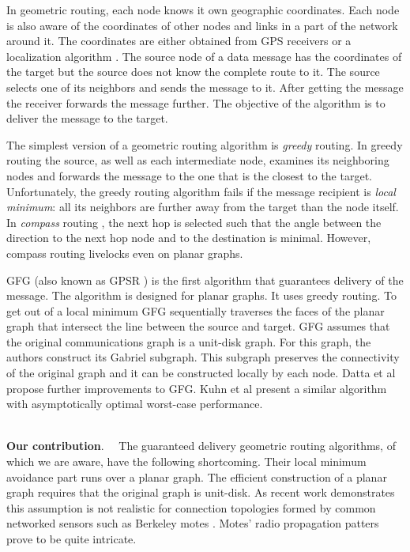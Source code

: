 \documentclass[conference]{IEEEtran}
\begin{document}
In geometric routing, each node knows it own geographic coordinates.
Each node is also aware of the coordinates of other nodes and links in
a part of the network around it. The coordinates are either obtained
from GPS receivers or a localization algorithm
\cite{Bulusu:2004:SCL}. The source node of a data message has the
coordinates of the target but the source does not know the complete
route to it. The source selects one of its neighbors and sends the
message to it.  After getting the message the receiver forwards the
message further.  The objective of the algorithm is to deliver the
message to the target.

The simplest version of a geometric routing algorithm is \emph{greedy}
routing. In greedy routing the source, as well as each intermediate
node, examines its neighboring nodes and forwards the message to the
one that is the closest to the target. Unfortunately, the greedy
routing algorithm fails if the message recipient is \emph{local
minimum}: all its neighbors are further away from the target than the
node itself. In \emph{compass} routing \cite{CCCG99*51}, the next hop
is selected such that the angle between the direction to the next hop
node and to the destination is minimal. However, compass routing
livelocks even on planar graphs.

GFG \cite{Bose01} (also known as GPSR \cite{MOBICOM00*243}) is the
first algorithm that guarantees delivery of the message. The algorithm
is designed for planar graphs. It uses greedy routing. To get out of a
local minimum GFG sequentially traverses the faces of the planar graph
that intersect the line between the source and target. GFG assumes
that the original communications graph is a unit-disk graph. For this
graph, the authors construct its Gabriel subgraph. This subgraph
preserves the connectivity of the original graph and it can be
constructed locally by each node. Datta et al \cite{DSW02} propose
further improvements to GFG.  Kuhn et al \cite{DialM`02*24} present a
similar algorithm with asymptotically optimal worst-case performance.

\ \\ \textbf{Our contribution}. \ \ The guaranteed delivery geometric
routing algorithms, of which we are aware, have the following
shortcoming.  Their local minimum avoidance part runs over a planar
graph. The efficient construction of a planar graph requires that the
original graph is unit-disk. As recent work \cite{G+02b} demonstrates
this assumption is not realistic for connection topologies formed by
common networked sensors such as Berkeley motes
\cite{Hill:2002:MWP}. Motes' radio propagation patters prove to be
quite intricate.
\end{document}
